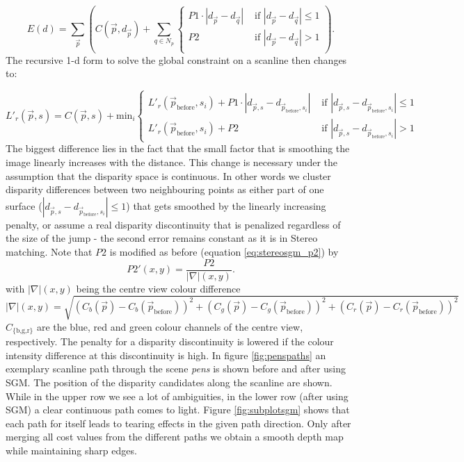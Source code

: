 \documentclass  [
  paper    = a4,
  BCOR     = 10mm,
  twoside,
  fontsize = 12pt,
  fleqn,
  toc      = bibnumbered,
  toc      = listofnumbered,
  numbers  = noendperiod,
  headings = normal,
  listof   = leveldown,
  version  = 3.03
]                                       {scrreprt}
\begin{document}
\begin{equation}\label{eq:global_sgm_cont}
E(d) = \sum_{\vec p} \left(C(\vec{p}, d_{\vec p}) + \sum_{q\in N_p} 
\begin{cases}
P1\cdot |d_{\vec p} - d_{\vec q}|  & \text{ if }|d_{\vec p} - d_{\vec q}| \leq 1\\
P2 & \text{ if }|d_{\vec p} - d_{\vec q}| > 1\\
\end{cases}  
\right).
\end{equation}
The recursive 1-d form to solve the global constraint on a scanline then changes to:

\begin{equation}\label{eq:recursive1d}
L'_r(\vec{p}, s) = C(\vec{p}, s) + \text{min}_i
\begin{cases}
L'_r(\vec{p}_\text{before}, s_i)+P1 \cdot |d_{\vec p, s} - d_{\vec{p}_\text{before}, s_i}|  & \text{ if }|d_{\vec p, s} - d_{\vec{p}_\text{before}, s_i}| \leq 1 \\
L'_r(\vec{p}_\text{before}, s_i)+P2 & \text{ if }|d_{\vec p, s} - d_{\vec{p}_\text{before}, s_i}| > 1
\end{cases}
\end{equation} 
The biggest difference lies in the fact that the small factor that is smoothing the image linearly increases with the distance. This change is necessary under the assumption that the disparity space is continuous. In other words we cluster disparity differences between two neighbouring points as either part of one surface ($|d_{\vec p, s} - d_{\vec{p}_\text{before}, s_i}| \leq 1$) that gets smoothed by the linearly increasing penalty, or assume a real disparity discontinuity that is penalized regardless of the size of the jump - the second error remains constant as it is in Stereo matching. Note that $P2$ is modified as before (equation \ref{eq:stereosgm_p2}) by 
\begin{equation}\label{eq:gradientp2}
P2'(x,y) = \frac{P2}{|\nabla|(x,y)}.
\end{equation}
with $|\nabla|(x,y)$ being the centre view colour difference
 \begin{equation}\label{key}
 |\nabla|(x,y) = \sqrt{\left(C_b(\vec p) - C_b(\vec p_\text{before})\right)^2 + \left(C_g(\vec p) - C_g(\vec p_\text{before})\right)^2+ \left(C_r(\vec p) - C_r(\vec p_\text{before})\right)^2}
 \end{equation}
  $C_\text{\{b,g,r\}}$ are the blue, red and green colour channels of the centre view, respectively. The penalty for a disparity discontinuity is lowered if the colour intensity difference at this discontinuity is high. In figure \ref{fig:penspaths} an exemplary scanline path through the scene \textit{pens} is shown before and after using SGM. The position of the disparity candidates along the scanline are shown. While in the upper row we see a lot of ambiguities, in the lower row (after using SGM) a clear continuous path comes to light. Figure \ref{fig:subplotsgm} shows that each path for itself leads to tearing effects in the given path direction. Only after merging all cost values from the different paths we obtain a smooth depth map while maintaining sharp edges.
\end{document}
